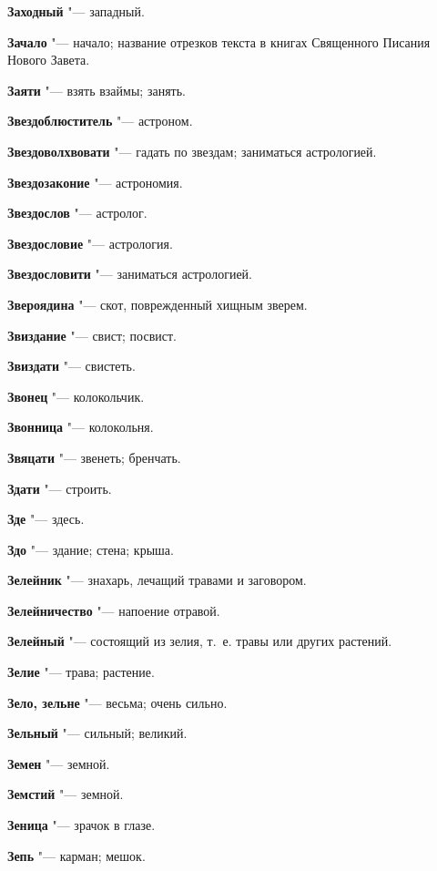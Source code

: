 \begin{mymulticols}
\noindent\textbf{Заходный} "--- западный. 

\noindent\textbf{Зачало} "--- начало; название отрезков текста в книгах Священного Писания Нового Завета. 

\noindent\textbf{Заяти} "--- взять взаймы; занять. 

\noindent\textbf{Звездоблюститель} "--- астроном. 

\noindent\textbf{Звездоволхвовати} "--- гадать по звездам; заниматься астрологией. 

\noindent\textbf{Звездозаконие} "--- астрономия. 

\noindent\textbf{Звездослов} "--- астролог. 

\noindent\textbf{Звездословие} "--- астрология. 

\noindent\textbf{Звездословити} "--- заниматься астрологией. 

\noindent\textbf{Звероядина} "--- скот, поврежденный хищным зверем. 

\noindent\textbf{Звиздание} "--- свист; посвист. 

\noindent\textbf{Звиздати} "--- свистеть. 

\noindent\textbf{Звонец} "--- колокольчик. 

\noindent\textbf{Звонница} "--- колокольня. 

\noindent\textbf{Звяцати} "--- звенеть; бренчать. 

\noindent\textbf{Здати} "--- строить. 

\noindent\textbf{Зде} "--- здесь. 

\noindent\textbf{Здо} "--- здание; стена; крыша. 

\noindent\textbf{Зелейник} "--- знахарь, лечащий травами и заговором. 

\noindent\textbf{Зелейничество} "--- напоение отравой. 

\noindent\textbf{Зелейный} "--- состоящий из зелия, т.~е. травы или других растений. 

\noindent\textbf{Зелие} "--- трава; растение. 

\noindent\textbf{Зело, зельне} "--- весьма; очень сильно. 

\noindent\textbf{Зельный} "--- сильный; великий. 

\noindent\textbf{Земен} "--- земной. 

\noindent\textbf{Земстий} "--- земной. 

\noindent\textbf{Зеница} "--- зрачок в глазе. 

\noindent\textbf{Зепь} "--- карман; мешок. 


\end{mymulticols}
